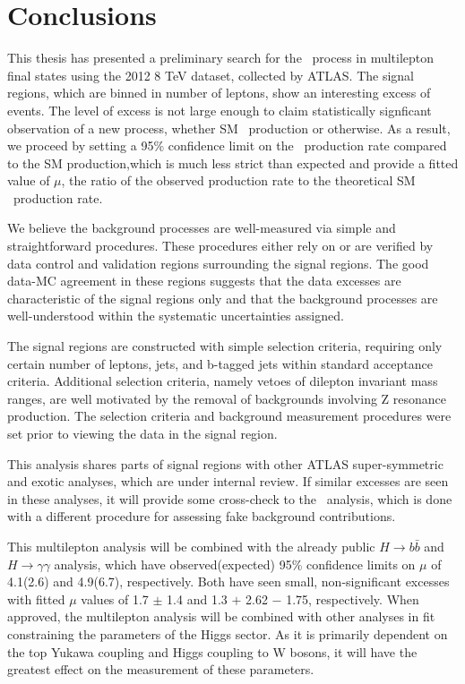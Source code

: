 \chapter[Conclusions][Conclusions]{Conclusions}

This thesis has presented a preliminary search for the \tth\ process in multilepton
final states using the 2012 8 TeV dataset, collected by ATLAS. The signal regions,
which are binned in number of leptons, show an interesting excess of events. The level of excess is not large enough
to claim statistically signficant observation of a new process, whether SM \tth\ production or otherwise. As
a result, we proceed by setting a 95\% confidence limit on the \tth\ production rate
compared to the SM production,which is much less strict than expected and provide a fitted value of $\mu$,
the ratio of the observed production rate to the theoretical SM \tth\ production rate.

We believe the background processes are well-measured via simple and 
straightforward procedures. These procedures either rely on or are verified by
data control and validation regions surrounding the signal regions. The good
data-MC agreement in these regions suggests that the data excesses are characteristic
of the signal regions only and that the background processes are well-understood
within the systematic uncertainties assigned. 

The signal regions are constructed with simple selection criteria, requiring 
only certain number of leptons, jets, and b-tagged jets within standard
acceptance criteria. Additional selection criteria, namely vetoes of
dilepton invariant mass ranges, are well motivated by the removal
of backgrounds involving Z resonance production. The selection criteria
and background measurement procedures were set prior to viewing the 
data in the signal region.

This analysis shares parts of signal regions with other ATLAS super-symmetric
and exotic analyses, which are under internal review. If similar excesses are seen in these analyses,
it will provide some cross-check to the \tth\ analysis, which is done with a
different procedure for assessing fake background contributions.

This multilepton analysis will be combined with the already public $H\rightarrow b\bar{b}$ \cite{Aad:2014lma} and
$H\rightarrow\gamma\gamma$\cite{ATLAS-CONF-2014-011} analysis, which have observed(expected) 95\%
confidence limits on $\mu$ of 4.1(2.6) and 4.9(6.7), respectively. Both have seen small, non-significant excesses 
with fitted $\mu$ values of 1.7 $\pm$ 1.4 and 1.3 $+$ 2.62 $-$ 1.75, respectively. When approved,
the multilepton analysis will be combined with other analyses in fit constraining the parameters of the Higgs sector.
As it is primarily dependent on the top Yukawa coupling and Higgs coupling to W bosons, it will
have the greatest effect on the measurement of these parameters.


